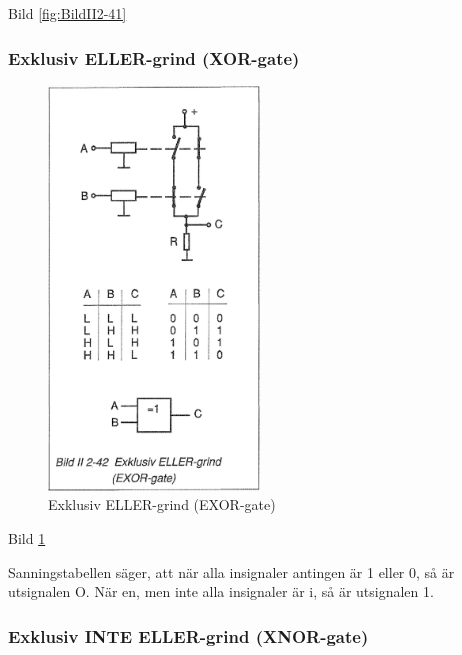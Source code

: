 Bild \ref{fig:BildII2-41}

\subsubsection{Exklusiv ELLER-grind (XOR-gate)}

\begin{figure}
\includegraphics[width=0.5\textwidth]{images/bild_2_2-42}
\caption{Exklusiv ELLER-grind (EXOR-gate)}
\label{fig:BildII2-42}
\end{figure}

Bild \ref{fig:BildII2-42}

Sanningstabellen säger, att när alla insignaler antingen är 1 eller 0, så är
utsignalen O. När en, men inte alla insignaler är i, så är utsignalen 1.

\subsubsection{Exklusiv INTE ELLER-grind (XNOR-gate)}

